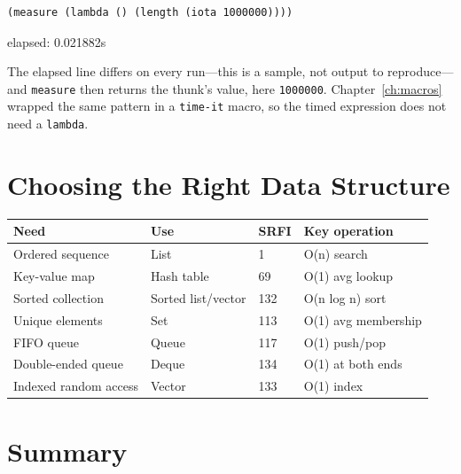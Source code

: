 \begin{lstlisting}
(measure (lambda () (length (iota 1000000))))
\end{lstlisting}

\begin{codeoutput}
elapsed: 0.021882s
\end{codeoutput}

The elapsed line differs on every run---this is a sample, not output to reproduce---and \texttt{measure} then returns the thunk's value, here \texttt{1000000}. Chapter~\ref{ch:macros} wrapped the same pattern in a \texttt{time-it} macro, so the timed expression does not need a \texttt{lambda}.

\section{Choosing the Right Data Structure}

\begin{center}
\begin{tabular}{llll}
\textbf{Need} & \textbf{Use} & \textbf{SRFI} & \textbf{Key operation} \\
\hline
Ordered sequence & List & 1 & O(n) search \\
Key-value map & Hash table & 69 & O(1) avg lookup \\
Sorted collection & Sorted list/vector & 132 & O(n log n) sort \\
Unique elements & Set & 113 & O(1) avg membership \\
FIFO queue & Queue & 117 & O(1) push/pop \\
Double-ended queue & Deque & 134 & O(1) at both ends \\
Indexed random access & Vector & 133 & O(1) index \\
\end{tabular}
\end{center}

\section*{Summary}

